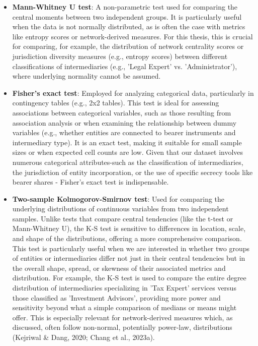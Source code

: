 \begin{itemize}
    \item \textbf{Mann-Whitney U test}: A non-parametric test used for comparing the central moments between two independent groups. It is particularly useful when the data is not normally distributed, as is often the case with metrics like entropy scores or network-derived measures. For this thesis, this is crucial for comparing, for example, the distribution of network centrality scores or jurisdiction diversity measures (e.g., entropy scores) between different classifications of intermediaries (e.g., 'Legal Expert' vs. 'Administrator'), where underlying normality cannot be assumed.

    \item \textbf{Fisher's exact test}: Employed for analyzing categorical data, particularly in contingency tables (e.g., 2x2 tables). This test is ideal for assessing associations between categorical variables, such as those resulting from association analysis or when examining the relationship between dummy variables (e.g., whether entities are connected to bearer instruments and intermediary type). It is an exact test, making it suitable for small sample sizes or when expected cell counts are low. Given that our dataset involves numerous categorical attributes-such as the classification of intermediaries, the jurisdiction of entity incorporation, or the use of specific secrecy tools like bearer shares - Fisher's exact test is indispensable.

    \item \textbf{Two-sample Kolmogorov-Smirnov test}: Used for comparing the underlying distributions of continuous variables from two independent samples. Unlike tests that compare central tendencies (like the t-test or Mann-Whitney U), the K-S test is sensitive to differences in location, scale, and shape of the distributions, offering a more comprehensive comparison. This test is particularly useful when we are interested in whether two groups of entities or intermediaries differ not just in their central tendencies but in the overall shape, spread, or skewness of their associated metrics and distribution. For example, the K-S test is used to compare the entire degree distribution of intermediaries specializing in 'Tax Expert' services versus those classified as 'Investment Advisors', providing more power and sensitivity beyond what a simple comparison of medians or means might offer. This is especially relevant for network-derived measures which, as discussed, often follow non-normal, potentially power-law, distributions (Kejriwal \& Dang, 2020; Chang et al., 2023a).
\end{itemize}


